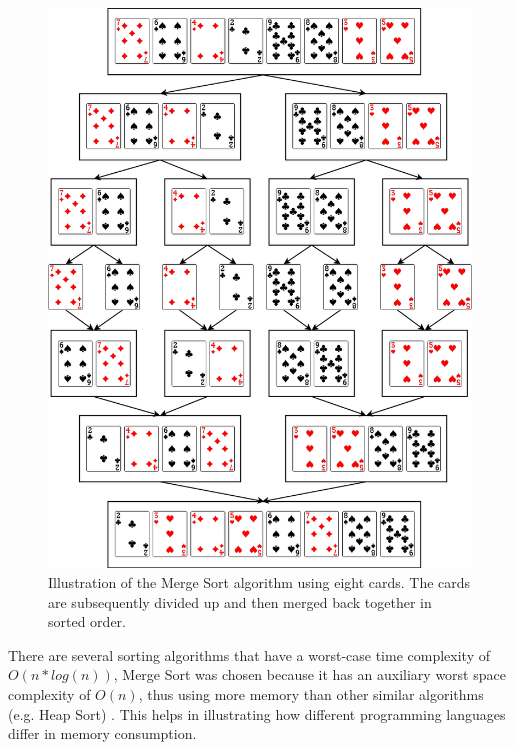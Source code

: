 \begin{figure}[h]
	\centering
	\includegraphics[width=0.9\linewidth]{chapters/media/mergesort4.png}
	\caption{Illustration of the Merge Sort algorithm using eight cards. The cards are subsequently divided up and then merged back together in sorted order.}
	\label{fig:mergesort}
\end{figure}

There are several sorting algorithms that have a worst-case time complexity of $O(n * log(n))$, Merge Sort was chosen because it has an auxiliary worst space complexity of $O(n)$, thus using more memory than other similar algorithms (e.g. Heap Sort) \cite{Mergesort}. This helps in illustrating how different programming languages differ in memory consumption.





